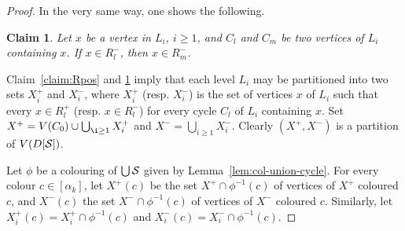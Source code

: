 \documentclass[utf8,10pt]{article}
\theoremstyle{plain}
\newtheorem{lemma}[theorem]{Lemma}
\newtheorem{claim}{Claim}[theorem]
\theoremstyle{definition}
\theoremstyle{remark}
\begin{document}
\begin{proof}
In the very same way, one shows the following.

\begin{claim}\label{claim:Rneg}
Let $x$ be a vertex in $L_i$, $i\geq 1$, and $C_l$ and $C_m$ be two vertices of $L_i$ containing $x$.
If $x \in R^-_l$, then  $x \in  R^-_m$.
\end{claim}

Claim~\ref{claim:Rpos} and \ref{claim:Rneg} imply that each level $L_i$ may be partitioned into two sets $X^+_i$ and $X^-_i$, where
$X^+_i$ (resp.  $X^-_i$) is the set of vertices $x$ of $L_i$ such that every $x\in R^+_l$ (resp. $x\in R^-_l$) for every cycle $C_l$ of $L_i$ containing $x$.
Set $X^+=V(C_0) \cup \bigcup_{\i\geq 1} X^+_i$ and $X^-=\bigcup_{i\geq 1} X^-_i$. Clearly $(X^+, X^-)$ is a partition of $V(D[{\cal S}])$.


%

Let $\phi$ be a colouring of $\bigcup {\cal S}$ given by Lemma~\ref{lem:col-union-cycle}.
For every colour $c\in [\alpha_k]$, let $X^+(c)$ be the set $X^+\cap \phi^{-1}(c)$ of vertices of $X^+$ coloured $c$, and $X^-(c)$ the set $X^-\cap \phi^{-1}(c)$ of vertices of $X^-$ coloured $c$. Similarly, let  $X^+_i(c)= X^+_i\cap \phi^{-1}(c)$ and $X^-_i(c)= X^-_i\cap \phi^{-1}(c)$.




\end{proof}
\end{document}
